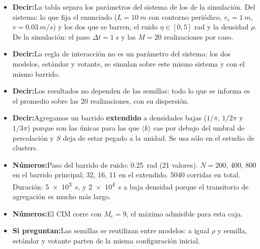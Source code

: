\documentclass[10pt,a4paper]{article}
\newcommand{\Mc}{\ensuremath{M_{\mathrm{c}}}}
\newcommand{\diapo}[3]{%
    \needspace{5\baselineskip}%
    \vspace{0.7em}%
    \noindent\colorbox{azul}{\makebox[2.1em]{\color{white}\bfseries\small #1}}%
    \colorbox{grisclaro}{\makebox[\dimexpr\linewidth-2.1em-4\fboxsep\relax][l]{%
        \color{azul}\bfseries\small\hspace{0.4em}#2\hfill
        {\color{gris}\mdseries #3}\hspace{0.4em}}}%
    \par\vspace{0.35em}}
\newcommand{\decir}{\textbf{\color{azul}Decir:}\;}
\newcommand{\nums}{\textbf{\color{acento}Números:}\;}
\newcommand{\preg}{\textbf{\color{gris}Si preguntan:}\;}
\newenvironment{notas}
    {\begin{itemize}[leftmargin=1.1em,itemsep=0.15em,topsep=0.15em,parsep=0pt]}
    {\end{itemize}}
\begin{document}
\diapo{8}{Sistema particular}{\SI{40}{s}}
\begin{notas}
    \item \decir La tabla separa los parámetros del sistema de los de la
          simulación. Del sistema: lo que fija el enunciado ($L = \SI{10}{m}$
          con contorno periódico, $r_c = \SI{1}{m}$, $v = \SI{0.03}{m/s}$) y
          los dos que se barren, el ruido $\eta \in [0, 5]$ rad y la densidad
          $\rho$. De la simulación: el paso $\Delta t = \SI{1}{s}$ y las
          $M = 20$ realizaciones por caso.
    \item \decir La regla de interacción no es un parámetro del sistema: los
          dos modelos, estándar y votante, se simulan sobre este mismo sistema
          y con el mismo barrido.
    \item \decir Los resultados no dependen de las semillas: todo lo que se
          informa es el promedio sobre las 20 realizaciones, con su
          dispersión.
    \item \decir Agregamos un barrido \textbf{extendido} a densidades bajas
          ($1/\pi$, $1/2\pi$ y $1/3\pi$) porque son las únicas para las que
          $\langle k\rangle$ cae por debajo del umbral de percolación y $S$ deja
          de estar pegado a la unidad. Se usa sólo en el estudio de clusters.
    \item \nums Paso del barrido de ruido: \SI{0.25}{rad} (21 valores).
          $N = 200$, \num{400}, \num{800} en el barrido principal; \num{32},
          \num{16}, \num{11} en el extendido. \num{5040} corridas en total. Duración: \SI{5e3}{s}, y \SI{2e4}{s} a
          baja densidad porque el transitorio de agregación es mucho más largo.
    \item \nums El CIM corre con $\Mc = 9$, el máximo admisible para esta caja.
    \item \preg Las semillas se reutilizan entre modelos: a igual $\rho$ y
          semilla, estándar y votante parten de la misma configuración inicial.
\end{notas}
\end{document}
